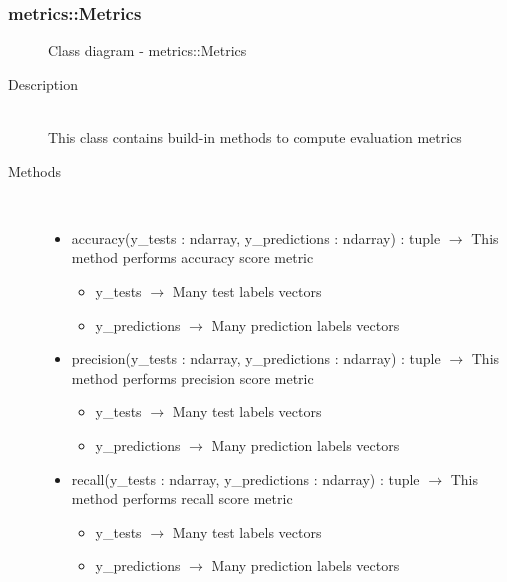 \subsubsection[Metrics]{metrics::Metrics}
\begin{figure}[h]
\centering
{}
\caption{Class diagram - metrics::Metrics}
\end{figure}\begin{description}
\item[Description] \hfill \\
 This class contains build-in methods to compute evaluation metrics
\item[Methods] \hfill \\
 \vspace{-1cm}
\begin{itemize}
\item accuracy(y\_tests : ndarray, y\_predictions : ndarray) : tuple $\rightarrow$ This method performs accuracy score metric\begin{itemize}
\item y\_tests $\rightarrow$ Many test labels vectors
\item y\_predictions $\rightarrow$ Many prediction labels vectors
\end{itemize}

\item precision(y\_tests : ndarray, y\_predictions : ndarray) : tuple $\rightarrow$ This method performs precision score metric\begin{itemize}
\item y\_tests $\rightarrow$ Many test labels vectors
\item y\_predictions $\rightarrow$ Many prediction labels vectors
\end{itemize}

\item recall(y\_tests : ndarray, y\_predictions : ndarray) : tuple $\rightarrow$ This method performs recall score metric\begin{itemize}
\item y\_tests $\rightarrow$ Many test labels vectors
\item y\_predictions $\rightarrow$ Many prediction labels vectors
\end{itemize}


\end{itemize}
\end{description}
